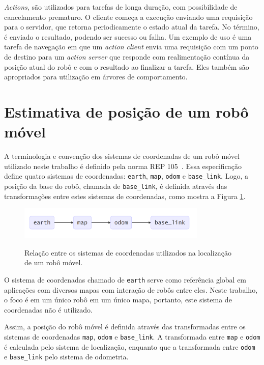 \documentclass[repeatfields,xlists,xpacks,oneside,yearsonly]{ufrgscca}
\begin{document}
\textit{Actions}, são utilizados para tarefas de longa duração, com possibilidade de
cancelamento prematuro.
O cliente começa a execução enviando uma requisição para o servidor,
que retorna periodicamente o estado atual da tarefa.
No término, é enviado o resultado, podendo ser sucesso ou falha.
Um exemplo de uso é uma tarefa de navegação em que um \textit{action client}
envia uma requisição com um ponto de destino para um \textit{action server}
que responde com realimentação contínua da posição atual do robô e
com o resultado ao finalizar a tarefa.
Eles também são apropriados para utilização em árvores de comportamento.

\section{Estimativa de posição de um robô móvel}

A terminologia e convenção dos sistemas de coordenadas de um robô
móvel utilizado neste trabalho é definido pela norma REP
105~\cite{rep_105}. Essa especificação define quatro sistemas de
coordenadas: \texttt{earth}, \texttt{map}, \texttt{odom} e
\texttt{base\_link}. Logo, a posição da base do robô, chamada de
\texttt{base\_link}, é definida através das transformações entre
estes sistemas de coordenadas, como mostra a Figura
\ref{fig:rep_105}.

\begin{figure}[H]
    {
        \centering
        \caption{Relação entre os sistemas de coordenadas utilizados na localização de um robô móvel.}
        \label{fig:rep_105}
        \includegraphics[width=0.8\textwidth]{tf_rep_105.png}\\
    }
    {}
\end{figure}

O sistema de coordenadas chamado de \texttt{earth} serve como
referência global em aplicações com diversos mapas com interação de
robôs entre eles. Neste trabalho, o foco é em um único robô em um
único mapa, portanto, este sistema de coordenadas não é utilizado.

Assim, a posição do robô móvel é definida através das transformadas
entre os sistemas de coordenadas \texttt{map}, \texttt{odom} e
\texttt{base\_link}. A transformada entre \texttt{map} e
\texttt{odom} é calculada pelo sistema de localização, enquanto que a
transformada entre \texttt{odom} e \texttt{base\_link} pelo sistema
de odometria.
\end{document}
